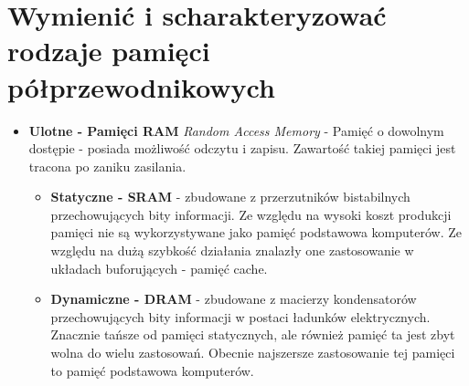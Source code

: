 \documentclass[12pt,a4paper]{article}
\begin{document}
	\section{Wymienić i scharakteryzować rodzaje pamięci półprzewodnikowych}
	\begin{itemize}
		\item \textbf{Ulotne - Pamięci RAM} \textit{Random Access Memory} - Pamięć o dowolnym dostępie - posiada możliwość odczytu i zapisu. Zawartość takiej pamięci jest tracona po zaniku zasilania. 
		\begin{itemize}
			\item \textbf{Statyczne - SRAM} - zbudowane z przerzutników bistabilnych przechowujących bity informacji. Ze względu na wysoki koszt produkcji pamięci nie są wykorzystywane jako pamięć podstawowa komputerów. Ze względu na dużą szybkość działania znalazły one zastosowanie w układach buforujących - pamięć cache. 
			\item \textbf{Dynamiczne - DRAM} - zbudowane z macierzy kondensatorów przechowujących bity informacji w postaci ładunków elektrycznych. Znacznie tańsze od pamięci statycznych, ale również pamięć ta jest zbyt wolna do wielu zastosowań. Obecnie najszersze zastosowanie tej pamięci to pamięć podstawowa komputerów. 
		\end{itemize}
	\end{itemize}
\end{document}
